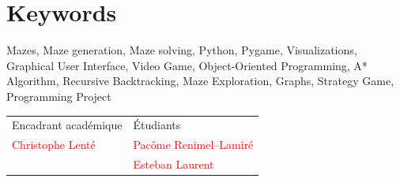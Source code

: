 \documentclass[12pt]{scrreprt} %
\begin{document}
\section*{Keywords}

Mazes,
Maze generation,
Maze solving,
Python,
Pygame,
Visualizations,
Graphical User Interface,
Video Game,
Object-Oriented Programming,
A* Algorithm,
Recursive Backtracking,
Maze Exploration,
Graphs,
Strategy Game,
Programming Project


\hrulefill

\vfill


\begin{table}[h]
    \begin{tabularx}{\textwidth}{|X|Y|}
        \hline
        Encadrant académique              & Étudiants                               \\
        \textcolor{red}{Christophe Lenté} & \textcolor{red}{Pacôme Renimel--Lamiré} \\
                                          & \textcolor{red}{Esteban Laurent}        \\
        \hline
    \end{tabularx}
\end{table}
\end{document}
